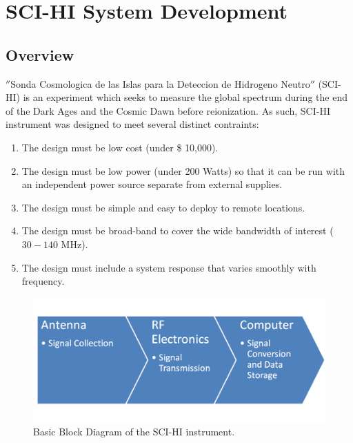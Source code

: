 \chapter{SCI-HI System Development}\label{Ch:System}

\section{Overview} \label{Sec:sysover}
$''$Sonda Cosmologica de las Islas para la Deteccion de Hidrogeno Neutro$''$ (SCI-HI) is an experiment which seeks to measure the \cm global spectrum during the end of the Dark Ages and the Cosmic Dawn before reionization. As such, SCI-HI instrument was designed to meet several distinct contraints:

\begin{enumerate}
\item The design must be low cost (under \$ 10,000).

\item The design must be low power (under  200 Watts) so that it can be run with an independent power source separate from external supplies. 

\item The design must be simple and easy to deploy to remote locations. 

\item The design must be broad-band to cover the wide bandwidth of interest ($30-140$ MHz).

\item The design must include a system response that varies smoothly with frequency. 

\end{enumerate}

\begin{figure}[htb]
\begin{center}
\includegraphics[width=0.9\linewidth]{SCIHI_system/figures/basic_block_diagram.png}
\caption{Basic Block Diagram of the SCI-HI instrument.}
\label{Fig:basic_block_diagram}
\end{center}
\end{figure}


